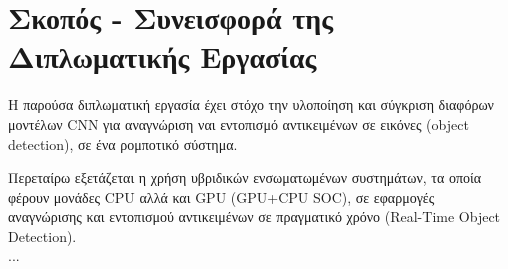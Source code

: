 \section{Σκοπός - Συνεισφορά της Διπλωματικής Εργασίας}
\label{section:contribution}
Η παρούσα διπλωματική εργασία  έχει στόχο την υλοποίηση και σύγκριση διαφόρων
μοντέλων CNN για αναγνώριση ναι εντοπισμό αντικειμένων σε εικόνες
(object detection), σε ένα ρομποτικό σύστημα.

Περεταίρω εξετάζεται η χρήση υβριδικών ενσωματωμένων συστημάτων, τα οποία
φέρουν μονάδες CPU αλλά και GPU (GPU+CPU SOC), σε εφαρμογές αναγνώρισης
και εντοπισμού αντικειμένων σε πραγματικό χρόνο (Real-Time Object Detection).
\\

...
